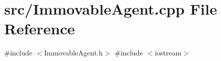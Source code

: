 \section{src/\+Immovable\+Agent.cpp File Reference}
\label{_immovable_agent_8cpp}
{\ttfamily \#include $<$Immovable\+Agent.\+h$>$}\newline
{\ttfamily \#include $<$iostream$>$}\newline

